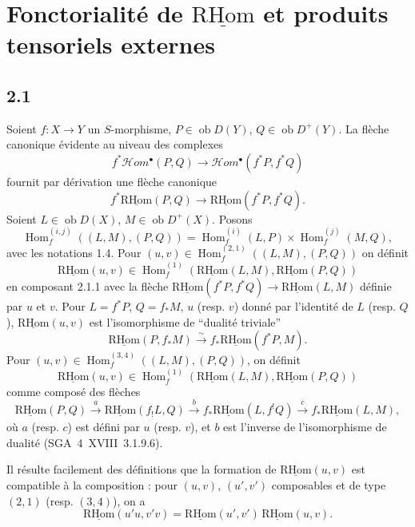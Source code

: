 \documentclass[11pt]{article}
\DeclareMathOperator{\Hom}{Hom}
\newcommand{\ob}{\operatorname{ob}}
\providecommand{\RHom}{\mathrm{RHom}}
\providecommand{\uRHom}{\underline{\RHom}}
\providecommand{\RHom}{\mathrm{RHom}}
\providecommand{\Hom}{\operatorname{Hom}}
\providecommand{\ob}{\operatorname{ob}}
\providecommand{\RHom}{\mathrm R\mathcal{H}om}
\providecommand{\RHom}{\mathrm{RHom}}
\providecommand{\Hom}{\operatorname{Hom}}
\begin{document}
\section{Fonctorialité de $\uRHom$ et produits tensoriels externes}

\subsection*{2.1}
Soient $f:X\to Y$ un $S$-morphisme, $P\in\ob D(Y)$, $Q\in\ob D^{+}(Y)$. La flèche canonique évidente au niveau des complexes
\[
f^{*}\mathcal Hom^{\bullet}(P,Q)\longrightarrow\mathcal Hom^{\bullet}(f^{*}P,f^{*}Q)
\]
fournit par dérivation une flèche canonique
\begin{equation}\tag{2.1.1}
f^{*}\uRHom(P,Q)\longrightarrow\uRHom(f^{*}P,f^{*}Q).
\end{equation}
Soient $L\in\ob D(X)$, $M\in\ob D^{+}(X)$. Posons
\begin{equation}\tag{2.1.2}
\Hom_f^{(i,j)}((L,M),(P,Q))=\Hom_f^{(i)}(L,P)\times\Hom_f^{(j)}(M,Q),
\end{equation}
avec les notations 1.4. Pour $(u,v)\in\Hom_f^{(2,1)}((L,M),(P,Q))$ on définit
\begin{equation}\tag{2.1.3}
\uRHom(u,v)\in\Hom_f^{(1)}(\uRHom(L,M),\uRHom(P,Q))
\end{equation}
en composant 2.1.1 avec la flèche $\uRHom(f^{*}P,f^{*}Q)\to\uRHom(L,M)$ définie par $u$ et $v$. Pour $L=f^{*}P$, $Q=f_{*}M$, $u$ (resp. $v$) donné par l'identité de $L$ (resp. $Q$), $\uRHom(u,v)$ est l'isomorphisme de ``dualité triviale''
\begin{equation}\tag{2.1.4}
\uRHom(P,f_{*}M)\xrightarrow{\sim}f_{*}\uRHom(f^{*}P,M).
\end{equation}
Pour $(u,v)\in\Hom_f^{(3,4)}((L,M),(P,Q))$, on définit
\begin{equation}\tag{2.1.5}
\uRHom(u,v)\in\Hom_f^{(1)}(\uRHom(L,M),\uRHom(P,Q))
\end{equation}
comme composé des flèches
\[
\uRHom(P,Q)\xrightarrow{a}\uRHom(f_{!}L,Q)\xrightarrow{b}f_{*}\uRHom(L,f^{!}Q)\xrightarrow{c}f_{*}\uRHom(L,M),
\]
où $a$ (resp. $c$) est défini par $u$ (resp. $v$), et $b$ est l'inverse de l'isomorphisme de dualité (SGA~4~XVIII~3.1.9.6).

Il résulte facilement des définitions que la formation de $\uRHom(u,v)$ est compatible à la composition : pour $(u,v)$, $(u',v')$ composables et de type $(2,1)$ (resp. $(3,4)$), on a
\begin{equation}\tag{2.1.6}
\uRHom(u'u,v'v)=\uRHom(u',v')\,\uRHom(u,v).
\end{equation}
\end{document}
